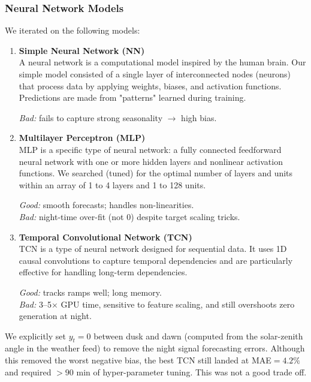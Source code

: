 \subsubsection*{Neural Network Models}
We iterated on the following models:
\begin{enumerate}
  \item \textbf{Simple Neural Network (NN)}\\
        A neural network is a computational model inspired by the human brain. 
        Our simple model consisted of a single layer of interconnected nodes (neurons) 
        that process data by applying weights, biases, and activation functions.
        Predictions are made from "patterns" learned during training.
        \vspace{-0.4cm}

        \emph{Bad:} fails to capture strong seasonality $\rightarrow$ high bias.
  \item \textbf{Multilayer Perceptron (MLP)}\\
        MLP is a specific type of neural network: a fully connected feedforward neural 
        network with one or more hidden layers and nonlinear activation functions.
        We searched (tuned) for the optimal number of layers and units within an array of 1 
        to 4 layers and 1 to 128 units.

        \emph{Good:} smooth forecasts; handles non-linearities.\\
        \emph{Bad:} night-time over-fit (not 0) despite target scaling tricks.
  \item \textbf{Temporal Convolutional Network (TCN)}\\
        TCN is a type of neural network designed for sequential data. It uses 1D causal 
        convolutions to capture temporal dependencies and are particularly effective for 
        handling long-term dependencies.

        \emph{Good:} tracks ramps well; long memory.\\
        \emph{Bad:} 3--5× GPU time, sensitive to feature scaling, and still
        overshoots zero generation at night.
\end{enumerate}

We explicitly set $y_t=0$ between dusk and dawn (computed from the
solar-zenith angle in the weather feed) to remove the night signal forecasting errors.
Although this removed the worst negative bias, the best TCN still landed at \textrm{MAE}$=4.2\%$ and required
$>\!90$ min of hyper-parameter tuning. This was not a good trade off.

